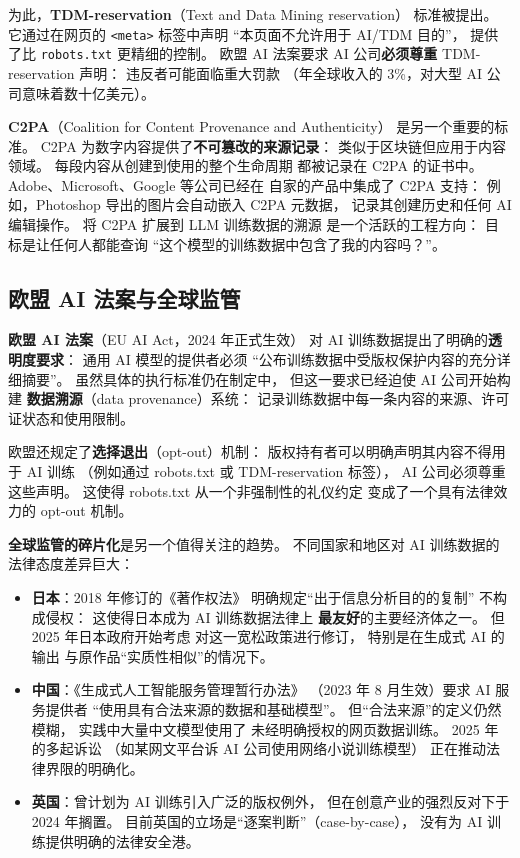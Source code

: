 为此，\textbf{TDM-reservation}（Text and Data Mining reservation）
标准被提出。
它通过在网页的 \texttt{<meta>} 标签中声明
“本页面不允许用于 AI/TDM 目的”，
提供了比 \texttt{robots.txt} 更精细的控制。
欧盟 AI 法案要求 AI 公司\textbf{必须尊重}
TDM-reservation 声明：
违反者可能面临重大罚款
（年全球收入的 3\%，对大型 AI 公司意味着数十亿美元）。

\textbf{C2PA}（Coalition for Content Provenance and Authenticity）
是另一个重要的标准。
C2PA 为数字内容提供了\textbf{不可篡改的来源记录}：
类似于区块链但应用于内容领域。
每段内容从创建到使用的整个生命周期
都被记录在 C2PA 的证书中。
Adobe、Microsoft、Google 等公司已经在
自家的产品中集成了 C2PA 支持：
例如，Photoshop 导出的图片会自动嵌入 C2PA 元数据，
记录其创建历史和任何 AI 编辑操作。
将 C2PA 扩展到 LLM 训练数据的溯源
是一个活跃的工程方向：
目标是让任何人都能查询
“这个模型的训练数据中包含了我的内容吗？”。

\subsection{欧盟 AI 法案与全球监管}

\textbf{欧盟 AI 法案}（EU AI Act，2024 年正式生效）
对 AI 训练数据提出了明确的\textbf{透明度要求}：
通用 AI 模型的提供者必须
“公布训练数据中受版权保护内容的充分详细摘要”。
虽然具体的执行标准仍在制定中，
但这一要求已经迫使 AI 公司开始构建
\textbf{数据溯源}（data provenance）系统：
记录训练数据中每一条内容的来源、许可证状态和使用限制。

欧盟还规定了\textbf{选择退出}（opt-out）机制：
版权持有者可以明确声明其内容不得用于 AI 训练
（例如通过 robots.txt 或 TDM-reservation 标签），
AI 公司必须尊重这些声明。
这使得 robots.txt 从一个非强制性的礼仪约定
变成了一个具有法律效力的 opt-out 机制。

\textbf{全球监管的碎片化}是另一个值得关注的趋势。
不同国家和地区对 AI 训练数据的法律态度差异巨大：

\begin{itemize}[noitemsep]
  \item \textbf{日本}：2018 年修订的《著作权法》
        明确规定“出于信息分析目的的复制”
        不构成侵权：
        这使得日本成为 AI 训练数据法律上
        \textbf{最友好}的主要经济体之一。
        但 2025 年日本政府开始考虑
        对这一宽松政策进行修订，
        特别是在生成式 AI 的输出
        与原作品“实质性相似”的情况下。
  \item \textbf{中国}：《生成式人工智能服务管理暂行办法》
        （2023 年 8 月生效）要求 AI 服务提供者
        “使用具有合法来源的数据和基础模型”。
        但“合法来源”的定义仍然模糊，
        实践中大量中文模型使用了
        未经明确授权的网页数据训练。
        2025 年的多起诉讼
        （如某网文平台诉 AI 公司使用网络小说训练模型）
        正在推动法律界限的明确化。
  \item \textbf{英国}：曾计划为 AI 训练引入广泛的版权例外，
        但在创意产业的强烈反对下于 2024 年搁置。
        目前英国的立场是“逐案判断”（case-by-case），
        没有为 AI 训练提供明确的法律安全港。
\end{itemize}


